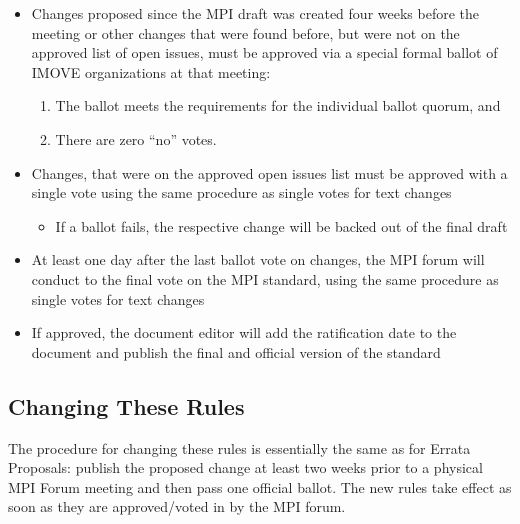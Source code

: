 \begin{enumerate}
\begin{enumerate}
\begin{itemize}
\item Changes proposed since the MPI draft was created four weeks before the meeting or other changes that were found before, but were not on the approved list of open issues, must be approved via a
    special formal ballot of IMOVE organizations at that meeting:
    \begin{enumerate}
    \item The ballot meets the requirements for the individual
      ballot quorum, and
    \item There are zero ``no'' votes.
    \end{enumerate}
\item Changes, that were on the approved open issues list must be approved with a single vote using the same procedure as single votes for text changes
\begin{itemize}
\item If a ballot fails, the respective change will be backed out of the final draft
\end{itemize}
\item At least one day after the last ballot vote on changes, the MPI forum will conduct to the final vote on the MPI standard, using the same procedure as single votes for text changes
\item If approved, the document editor will add the ratification date to the document and publish the final and official version of the standard
\end{itemize}

\end{enumerate}
 
\end{enumerate}


\subsection{Changing These Rules}

The procedure for changing these rules is essentially the same as for
Errata Proposals: publish the proposed change at least two weeks prior
to a physical MPI Forum meeting and then pass one official ballot. The
new rules take effect as soon as they are approved/voted in by the
MPI forum.

